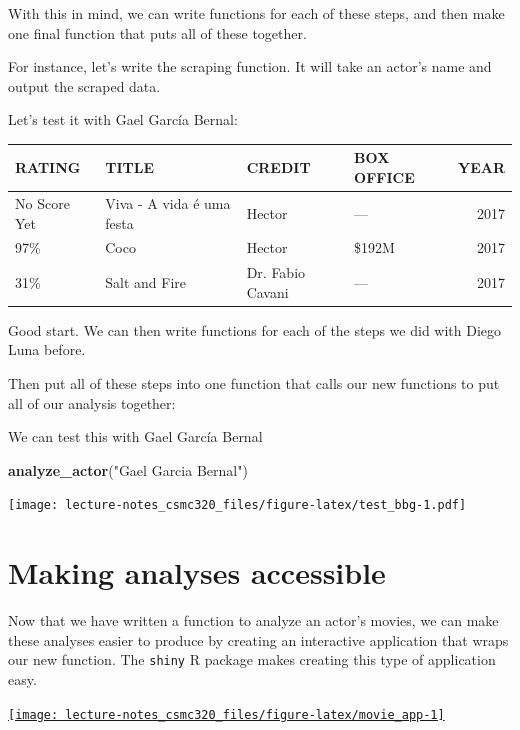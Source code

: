 \documentclass[12pt,]{book}
\newenvironment{Shaded}{\begin{snugshade}}{\end{snugshade}}
\newcommand{\KeywordTok}[1]{\textcolor[rgb]{0.13,0.29,0.53}{\textbf{#1}}}
\newcommand{\StringTok}[1]{\textcolor[rgb]{0.31,0.60,0.02}{#1}}
\newcommand{\NormalTok}[1]{#1}
\theoremstyle{definition}
\theoremstyle{definition}
\theoremstyle{definition}
\theoremstyle{remark}
\begin{document}
With this in mind, we can write functions for each of these steps, and
then make one final function that puts all of these together.

For instance, let's write the scraping function. It will take an actor's
name and output the scraped data.

Let's test it with Gael García Bernal:

\begin{tabular}{l|l|l|l|r}
\hline
RATING & TITLE & CREDIT & BOX OFFICE & YEAR\\
\hline
No Score Yet & Viva - A vida é uma festa & Hector & — & 2017\\
\hline
97\% & Coco & Hector & \$192M & 2017\\
\hline
31\% & Salt and Fire & Dr. Fabio Cavani & — & 2017\\
\hline
\end{tabular}

Good start. We can then write functions for each of the steps we did
with Diego Luna before.

Then put all of these steps into one function that calls our new
functions to put all of our analysis together:

We can test this with Gael García Bernal

\begin{Shaded}
\begin{Highlighting}[]
\KeywordTok{analyze_actor}\NormalTok{(}\StringTok{"Gael Garcia Bernal"}\NormalTok{)}
\end{Highlighting}
\end{Shaded}

\texttt{[image: lecture-notes\_csmc320\_files/figure-latex/test\_bbg-1.pdf]}

\section{Making analyses accessible}\label{making-analyses-accessible}

Now that we have written a function to analyze an actor's movies, we can
make these analyses easier to produce by creating an interactive
application that wraps our new function. The \texttt{shiny} R package
makes creating this type of application easy.

\begin{center}\href{https://hcorrada.shinyapps.io/movie_app/}{\texttt{[image: lecture-notes\_csmc320\_files/figure-latex/movie\_app-1]} }\end{center}
\end{document}
